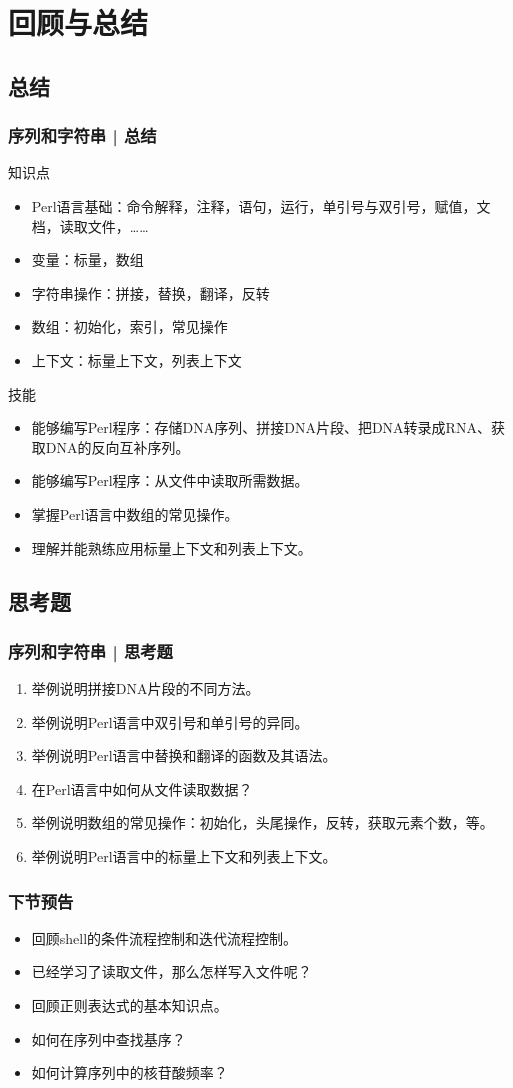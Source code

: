\section{回顾与总结}
\subsection{总结}
\begin{frame}
  \frametitle{序列和字符串 | 总结}
  \begin{block}{知识点}
    \begin{itemize}
      \item Perl语言基础：命令解释，注释，语句，运行，单引号与双引号，赋值，文档，读取文件，……
      \item 变量：标量，数组
      \item 字符串操作：拼接，替换，翻译，反转
      \item 数组：初始化，索引，常见操作
      \item 上下文：标量上下文，列表上下文
    \end{itemize}
  \end{block}
  \pause
  \begin{block}{技能}
    \begin{itemize}
      \item 能够编写Perl程序：存储DNA序列、拼接DNA片段、把DNA转录成RNA、获取DNA的反向互补序列。
      \item 能够编写Perl程序：从文件中读取所需数据。
      \item 掌握Perl语言中数组的常见操作。
      \item 理解并能熟练应用标量上下文和列表上下文。
    \end{itemize}
  \end{block}
\end{frame}

\subsection{思考题}
\begin{frame}
  \frametitle{序列和字符串 | 思考题}
  \begin{enumerate}
    \item 举例说明拼接DNA片段的不同方法。
    \item 举例说明Perl语言中双引号和单引号的异同。
    \item 举例说明Perl语言中替换和翻译的函数及其语法。
    \item 在Perl语言中如何从文件读取数据？
    \item 举例说明数组的常见操作：初始化，头尾操作，反转，获取元素个数，等。
    \item 举例说明Perl语言中的标量上下文和列表上下文。
  \end{enumerate}
\end{frame}

\begin{frame}
  \frametitle{下节预告}
  \begin{itemize}
    \item 回顾shell的条件流程控制和迭代流程控制。
    \item 已经学习了读取文件，那么怎样写入文件呢？
    \item 回顾正则表达式的基本知识点。
    \item 如何在序列中查找基序？
    \item 如何计算序列中的核苷酸频率？
  \end{itemize}
\end{frame}



